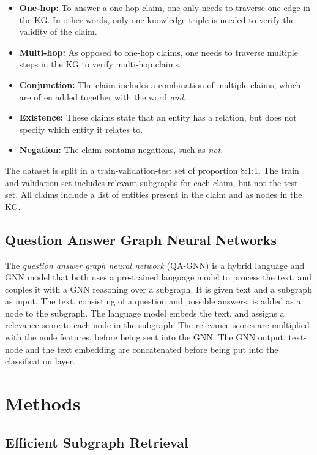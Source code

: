 \documentclass[11pt]{article}
\begin{document}
\begin{itemize}
    \item \textbf{One-hop:} To answer a one-hop claim, one only needs to traverse one edge in the KG. In other words, only one knowledge triple is needed to verify the validity of the claim.
    \item \textbf{Multi-hop:} As opposed to one-hop claims, one needs to traverse multiple steps in the KG to verify multi-hop claims.
    \item \textbf{Conjunction:} The claim includes a combination of multiple claims, which are often added together with the word \emph{and}.
    \item \textbf{Existence:} These claims state that an entity has a relation, but does not specify which entity it relates to.
    \item \textbf{Negation:} The claim contains negations, such as \emph{not}.
\end{itemize}

The dataset is split in a train-validation-test set of proportion 8:1:1. The train and validation set includes relevant subgraphs for each claim, but not the test set. All claims include a list of entities present in the claim and as nodes in the KG.

\subsection{Question Answer Graph Neural Networks}

The \emph{question answer graph neural network} (QA-GNN) \citep{yasunaga2021qa_gnn} is a hybrid language and GNN model that both uses a pre-trained language model to process the text, and couples it with a GNN reasoning over a subgraph. It is given text and a subgraph as input. The text, consisting of a question and possible answers, is added as a node to the subgraph. The language model embeds the text, and assigns a relevance score to each node in the subgraph. The relevance scores are multiplied with the node features, before being sent into the GNN. The GNN output, text-node and the text embedding are concatenated before being put into the classification layer.

\section{Methods}

\subsection{Efficient Subgraph Retrieval}
\end{document}
